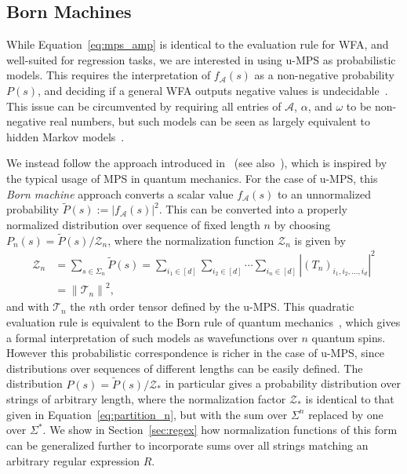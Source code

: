 \documentclass[twoside]{article}
\newcommand{\eqnref}[1]{Equation~\ref{#1}}
\newcommand{\Z}{\mc{Z}}
\newcommand{\Pt}{\tilde{P}}
\newcommand{\mc}[1]{\mathcal{#1}}
\begin{document}
\subsection{Born Machines}

While \eqnref{eq:mps_amp} is identical to the evaluation rule for WFA, and well-suited for regression tasks, we are interested in using u-MPS as probabilistic models. This requires the interpretation of $f_{\mc{A}}(s)$ as a non-negative probability $P(s)$, and deciding if a general WFA outputs negative values is  undecidable~\citep{denis2008}. This issue can be circumvented by requiring all entries of $\mc{A}$, $\alpha$, and $\omega$ to be non-negative real numbers, but such models can be seen as largely equivalent to hidden Markov models~\citep{denis2008}.

We instead follow the approach introduced in~\citep{pestun2017a} (see also~\citep{han2018}), which is inspired by the typical usage of MPS in quantum mechanics. For the case of u-MPS, this \emph{Born machine} approach converts a scalar value $f_{\mc{A}}(s)$ to an unnormalized probability $\Pt(s) := \left|f_{\mc{A}}(s)\right|^2$. This can be converted into a properly normalized distribution over sequence of fixed length $n$ by choosing $P_n(s) = \Pt(s) / \Z_n$, where the normalization function $\Z_n$ is given by
%
\begin{align}
\label{eq:partition_n}
\Z_n &= \sum_{s \in \Sigma_n} \Pt(s) = \sum_{i_1\in[d]} \sum_{i_2\in[d]} \cdots \sum_{i_n\in[d]} \left| (T_n)_{i_1,i_2,\ldots,i_d} \right|^2 \nonumber\\ 
&= \left\lVert\mc{T}_n\right\rVert^2,
\end{align}
%
and with $\mc{T}_n$ the $n$th order tensor defined by the u-MPS. This quadratic evaluation rule is equivalent to the Born rule of quantum mechanics~\citep{born1926}, which gives a formal interpretation of such models as wavefunctions over $n$ quantum spins. However this probabilistic correspondence is richer in the case of u-MPS, since distributions over sequences of different lengths can be easily defined. The distribution $P(s) = \Pt(s) / \Z_*$ in particular gives a probability distribution over strings of arbitrary length, where the normalization factor $\Z_*$ is identical to that given in \eqnref{eq:partition_n}, but with the sum over $\Sigma^n$ replaced by one over $\Sigma^*$. We show in Section~\ref{sec:regex} how normalization functions of this form can be generalized further to incorporate sums over all strings matching an arbitrary regular expression $R$.
\end{document}
